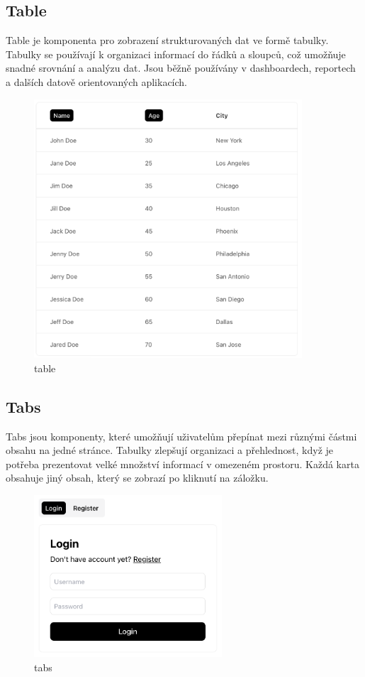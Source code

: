 \subsection{Table}
Table je komponenta pro zobrazení strukturovaných dat ve formě tabulky. Tabulky se používají k organizaci informací do řádků a sloupců, což umožňuje snadné srovnání a analýzu dat. Jsou běžně používány v dashboardech, reportech a dalších datově orientovaných aplikacích.

\begin{figure}[H]
  \centering
  \includegraphics[width=10cm]{images/table}
  \captionsetup{justification=centering,margin=2cm}
  \caption{table} \label{picture:table}
\end{figure}

\clearpage

\subsection{Tabs}
Tabs jsou komponenty, které umožňují uživatelům přepínat mezi různými částmi obsahu na jedné stránce. Tabulky zlepšují organizaci a přehlednost, když je potřeba prezentovat velké množství informací v omezeném prostoru. Každá karta obsahuje jiný obsah, který se zobrazí po kliknutí na záložku.

\begin{figure}[H]
  \centering
  \includegraphics[width=7cm]{images/tabs}
  \captionsetup{justification=centering,margin=2cm}
  \caption{tabs} \label{picture:tabs}
\end{figure}

